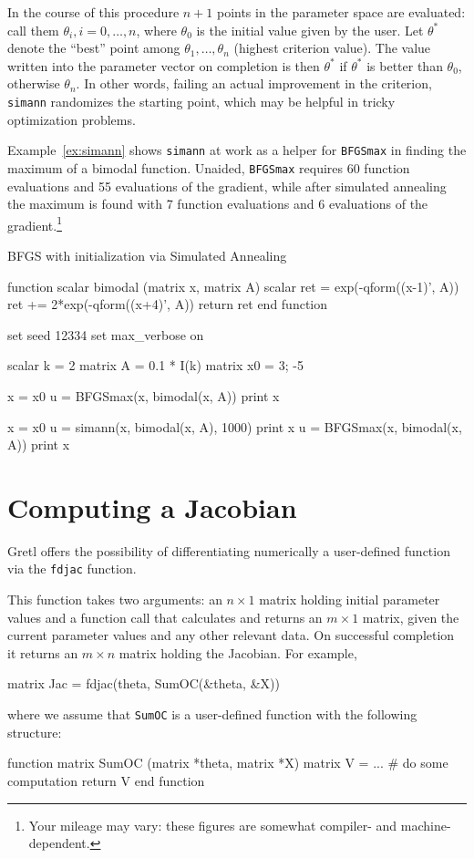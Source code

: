 In the course of this procedure $n+1$ points in the parameter space
are evaluated: call them $\theta_i, i=0,\dots,n$, where $\theta_0$ is
the initial value given by the user. Let $\theta^*$ denote the
``best'' point among $\theta_1, \dots, \theta_n$ (highest criterion
value). The value written into the parameter vector on completion is
then $\theta^*$ if $\theta^*$ is better than $\theta_0$, otherwise
$\theta_n$. In other words, failing an actual improvement in the
criterion, \texttt{simann} randomizes the starting point, which may be
helpful in tricky optimization problems.

Example~\ref{ex:simann} shows \texttt{simann} at work as a helper for
\texttt{BFGSmax} in finding the maximum of a bimodal function.
Unaided, \texttt{BFGSmax} requires 60 function evaluations and
55 evaluations of the gradient, while after simulated annealing
the maximum is found with 7 function evaluations and 6 evaluations
of the gradient.\footnote{Your mileage may vary: these figures
are somewhat compiler- and machine-dependent.}

\begin{script}[htbp]
  \caption{BFGS with initialization via Simulated Annealing}
  \label{ex:simann}
\begin{scode}
function scalar bimodal (matrix x, matrix A)
    scalar ret = exp(-qform((x-1)', A))
    ret += 2*exp(-qform((x+4)', A))
    return ret
end function

set seed 12334
set max_verbose on

scalar k = 2
matrix A = 0.1 * I(k)
matrix x0 = {3; -5}

x = x0
u = BFGSmax(x, bimodal(x, A))
print x

x = x0
u = simann(x, bimodal(x, A), 1000)
print x
u = BFGSmax(x, bimodal(x, A))
print x
\end{scode}
\end{script}

\section{Computing a Jacobian}
\label{sec:fdjac}

Gretl offers the possibility of differentiating numerically a
user-defined function via the \texttt{fdjac} function.

This function takes two arguments: an $n \times 1$ matrix holding
initial parameter values and a function call that calculates and
returns an $m \times 1$ matrix, given the current parameter values and
any other relevant data.  On successful completion it returns an $m
\times n$ matrix holding the Jacobian.  For example,
%
\begin{code}
matrix Jac = fdjac(theta, SumOC(&theta, &X))
\end{code}
where we assume that \texttt{SumOC} is a user-defined function with
the following structure:
%
\begin{code}
function matrix SumOC (matrix *theta, matrix *X)
  matrix V = ...  # do some computation
  return V
end function
\end{code}

